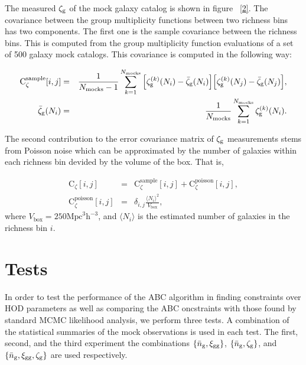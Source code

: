 \documentclass[12pt, preprint]{aastex}
\begin{document}
The measured $\mathcal{\zeta}_{\rm g}$ of the mock galaxy catalog is shown in figure ~\ref{2}. The covariance between the group multiplicity functions between two richness bins has two components. The first one is the sample covariance between the richness bins. This is computed from the group multiplicity function evaluations of a set of 500 galaxy mock catalogs. This covariance is computed in the following way:

\begin{eqnarray} 
\mathrm{C}_{\zeta}^{\mathrm{sample}}[i,j] &=& \frac{1}{N_{\mathrm{mocks}}-1}\sum_{k=1}^{N_{\mathrm{mocks}}} \Big[\mathcal{\zeta}_{\rm g}^{(k)}(N_{i})-\bar{\zeta}_{\rm g}(N_{i})\Big]\Big[\mathcal{\zeta}_{\rm g}^{(k)}(N_{j})-\bar{\zeta}_{\rm g}(N_{j}) \Big], \\
\bar{\zeta}_{\rm g}(N_{i}) &=& \frac{1}{N_{\mathrm{mocks}}}\sum_{k=1}^{N_{\mathrm{mocks}}} \mathcal{\zeta}_{\rm g}^{(k)}(N_{i}).
\end{eqnarray}

The second contribution to the error covariance matrix of $\mathcal{\zeta}_{\rm g}$ measurements stems from Poisson noise which can be approximated by the number of galaxies within each richness bin devided by the volume of the box. That is,

\begin{eqnarray} 
\mathrm{C}_{\zeta}[i,j] &=& \mathrm{C}_{\zeta}^{\mathrm{sample}}[i,j] + \mathrm{C}_{\zeta}^{\mathrm{poisson}}[i,j], \\
\mathrm{C}_{\zeta}^{\mathrm{poisson}}[i,j] &=& \delta_{i,j}\frac{\langle N_{i}\rangle^{2}}{V_{\mathrm{box}}},
\end{eqnarray}
where $V_{\mathrm{box}} = 250 \mathrm{Mpc}^3\mathrm{h}^{-3}$, and $\langle N_{i}\rangle$ is the estimated number of galaxies in the richness bin $i$.


\section{Tests}\label{sec:test}

In order to test the performance of the ABC algorithm in finding constraints over HOD parameters as well as comparing the ABC oncstraints with those found by standard MCMC likelihood analysis, we perform three tests. A combination of the statistical summaries of the mock observations is used in each test. The first, second, and the third experiment the combinations $\{\bar{n}_{\mathrm{g}} , \xi_{\mathrm{gg}}\}$, $\{\bar{n}_{\mathrm{g}} , \mathcal{\zeta}_{\rm g}\}$, and $\{\bar{n}_{\mathrm{g}}, \xi_{\mathrm{gg}}, \mathcal{\zeta}_{\rm g}\}$ are used respectively. 
\end{document}
